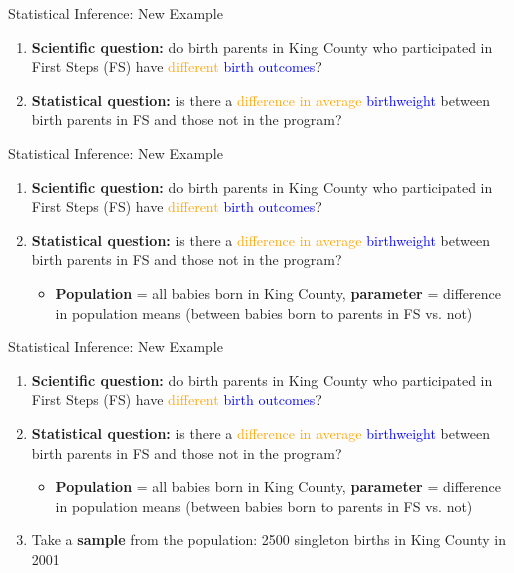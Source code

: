 \documentclass[10pt,t]{beamer}
\begin{document}
\begin{frame}{Statistical Inference: New Example}

\begin{enumerate}
	\item \textbf{Scientific question:} do birth parents in King County who participated in First Steps (FS) have \textcolor{orange}{different} \textcolor{blue}{birth outcomes}?
	\item \textbf{Statistical question:} is there a \textcolor{orange}{difference in average} \textcolor{blue}{birthweight} between birth parents in FS and those not in the program?
\end{enumerate}

\end{frame}

\begin{frame}{Statistical Inference: New Example}

\begin{enumerate}
	\item \textbf{Scientific question:} do birth parents in King County who participated in First Steps (FS) have \textcolor{orange}{different} \textcolor{blue}{birth outcomes}?
	\item \textbf{Statistical question:} is there a \textcolor{orange}{difference in average} \textcolor{blue}{birthweight} between birth parents in FS and those not in the program?
	\begin{itemize}
		\item \textbf{Population} = all babies born in King County, \textbf{parameter} = difference in population means (between babies born to parents in FS vs. not)
	\end{itemize}
\end{enumerate}

\end{frame}

\begin{frame}{Statistical Inference: New Example}

\begin{enumerate}
	\item \textbf{Scientific question:} do birth parents in King County who participated in First Steps (FS) have \textcolor{orange}{different} \textcolor{blue}{birth outcomes}?
	\item \textbf{Statistical question:} is there a \textcolor{orange}{difference in average} \textcolor{blue}{birthweight} between birth parents in FS and those not in the program?
	\begin{itemize}
		\item \textbf{Population} = all babies born in King County, \textbf{parameter} = difference in population means (between babies born to parents in FS vs. not)
	\end{itemize}
	\item Take a \textbf{sample} from the population: 2500 singleton births in King County in 2001
\end{enumerate}

\end{frame}
\end{document}
